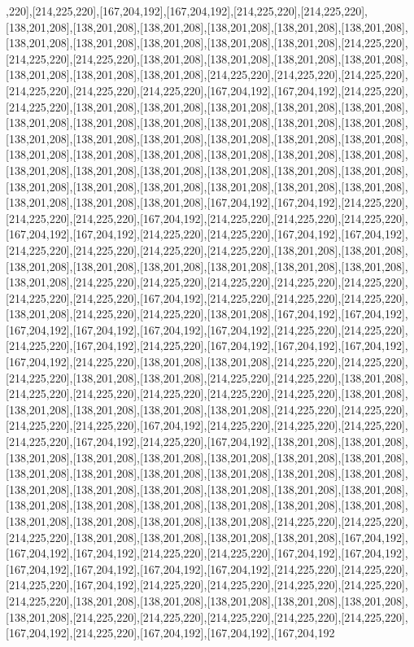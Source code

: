 ,220],[214,225,220],[167,204,192],[167,204,192],[214,225,220],[214,225,220],[138,201,208],[138,201,208],[138,201,208],[138,201,208],[138,201,208],[138,201,208],[138,201,208],[138,201,208],[138,201,208],[138,201,208],[138,201,208],[214,225,220],[214,225,220],[214,225,220],[138,201,208],[138,201,208],[138,201,208],[138,201,208],[138,201,208],[138,201,208],[138,201,208],[214,225,220],[214,225,220],[214,225,220],[214,225,220],[214,225,220],[214,225,220],[167,204,192],[167,204,192],[214,225,220],[214,225,220],[138,201,208],[138,201,208],[138,201,208],[138,201,208],[138,201,208],[138,201,208],[138,201,208],[138,201,208],[138,201,208],[138,201,208],[138,201,208],[138,201,208],[138,201,208],[138,201,208],[138,201,208],[138,201,208],[138,201,208],[138,201,208],[138,201,208],[138,201,208],[138,201,208],[138,201,208],[138,201,208],[138,201,208],[138,201,208],[138,201,208],[138,201,208],[138,201,208],[138,201,208],[138,201,208],[138,201,208],[138,201,208],[138,201,208],[138,201,208],[138,201,208],[138,201,208],[138,201,208],[138,201,208],[167,204,192],[167,204,192],[214,225,220],[214,225,220],[214,225,220],[167,204,192],[214,225,220],[214,225,220],[214,225,220],[167,204,192],[167,204,192],[214,225,220],[214,225,220],[167,204,192],[167,204,192],[214,225,220],[214,225,220],[214,225,220],[214,225,220],[138,201,208],[138,201,208],[138,201,208],[138,201,208],[138,201,208],[138,201,208],[138,201,208],[138,201,208],[138,201,208],[214,225,220],[214,225,220],[214,225,220],[214,225,220],[214,225,220],[214,225,220],[214,225,220],[167,204,192],[214,225,220],[214,225,220],[214,225,220],[138,201,208],[214,225,220],[214,225,220],[138,201,208],[167,204,192],[167,204,192],[167,204,192],[167,204,192],[167,204,192],[167,204,192],[214,225,220],[214,225,220],[214,225,220],[167,204,192],[214,225,220],[167,204,192],[167,204,192],[167,204,192],[167,204,192],[214,225,220],[138,201,208],[138,201,208],[214,225,220],[214,225,220],[214,225,220],[138,201,208],[138,201,208],[214,225,220],[214,225,220],[138,201,208],[214,225,220],[214,225,220],[214,225,220],[214,225,220],[214,225,220],[138,201,208],[138,201,208],[138,201,208],[138,201,208],[138,201,208],[214,225,220],[214,225,220],[214,225,220],[214,225,220],[167,204,192],[214,225,220],[214,225,220],[214,225,220],[214,225,220],[167,204,192],[214,225,220],[167,204,192],[138,201,208],[138,201,208],[138,201,208],[138,201,208],[138,201,208],[138,201,208],[138,201,208],[138,201,208],[138,201,208],[138,201,208],[138,201,208],[138,201,208],[138,201,208],[138,201,208],[138,201,208],[138,201,208],[138,201,208],[138,201,208],[138,201,208],[138,201,208],[138,201,208],[138,201,208],[138,201,208],[138,201,208],[138,201,208],[138,201,208],[138,201,208],[138,201,208],[138,201,208],[138,201,208],[214,225,220],[214,225,220],[214,225,220],[138,201,208],[138,201,208],[138,201,208],[138,201,208],[167,204,192],[167,204,192],[167,204,192],[214,225,220],[214,225,220],[167,204,192],[167,204,192],[167,204,192],[167,204,192],[167,204,192],[167,204,192],[214,225,220],[214,225,220],[214,225,220],[167,204,192],[214,225,220],[214,225,220],[214,225,220],[214,225,220],[214,225,220],[138,201,208],[138,201,208],[138,201,208],[138,201,208],[138,201,208],[138,201,208],[214,225,220],[214,225,220],[214,225,220],[214,225,220],[214,225,220],[167,204,192],[214,225,220],[167,204,192],[167,204,192],[167,204,192